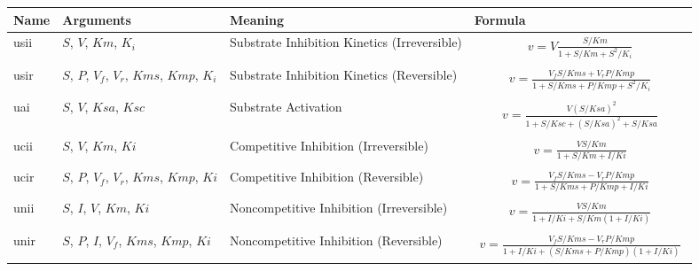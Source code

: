 \documentclass[10pt]{cek-article}
\begin{document}
\addtocounter{table}{-1}
\begin{table}[ht]
\setlength{\abovedisplayskip}{-2pt}
\setlength{\belowdisplayskip}{1pt}
\begin{tabular}{|p{0.5in}|>{\raggedright}m{0.77in}|>{\raggedright}m{1.5in}|m{3.2in}|}
\hline
\textbf{Name} & \textbf{Arguments} & \textbf{Meaning} &
\textbf{Formula} \\
\hline

usii & $S$, $V$, $Km$, $K_i$ & Substrate Inhibition Kinetics
(Irreversible) &
\begin{gather*}
v = V \frac{S/Km}{1 + S/Km + S^2/K_i}
\end{gather*}
\\ \hline

usir & $S$, $P$, $V_f$, $V_r$, $Kms$, $Kmp$, $K_i$ & Substrate
Inhibition Kinetics (Reversible) &
\begin{gather*}
v = \frac{V_f S/Kms + V_r
P/Kmp}{1 + S/Kms + P/Kmp + S^2/K_i}
\end{gather*}
\\ \hline

uai & $S$, $V$, $Ksa$, $Ksc$ & Substrate Activation &
\begin{gather*}
v = \frac{V \left( S/Ksa \right)^2}{1 + S/Ksc + \left( S/Ksa\right)^2
  + S/Ksa}
\end{gather*}
\\ \hline

ucii & $S$, $V$, $Km$, $Ki$ & Competitive Inhibition (Irreversible) &
\begin{gather*}
v = \frac{V S/Km}{1 + S/Km + I/Ki}
\end{gather*}
\\ \hline

ucir & $S$, $P$, $V_f$, $V_r$, $Kms$, $Kmp$, $Ki$ & Competitive Inhibition
(Reversible) &
\begin{gather*}
v = \frac{V_f S/Kms - V_r P/Kmp}{1 +
  S/Kms + P/Kmp + I/Ki}
\end{gather*}
\\ \hline

unii & $S$, $I$, $V$, $Km$, $Ki$ & Noncompetitive Inhibition
(Irreversible) &
\begin{gather*}
v = \frac{V S/Km}{1 + I/Ki + S/Km \left( 1 + I/Ki\right) }
\end{gather*}
\\ \hline

unir & $S$, $P$, $I$, $V_f$, $Kms$, $Kmp$, $Ki$ & Noncompetitive
Inhibition (Reversible) &
\begin{gather*}
v = \frac{V_f S/Kms - V_r P/Kmp}{1 +
  I/Ki + \left( S/Kms + P/Kmp \right) \left( 1 + I/Ki\right) }
\end{gather*}
\\ \hline


\end{tabular}
\end{table}
\end{document}
